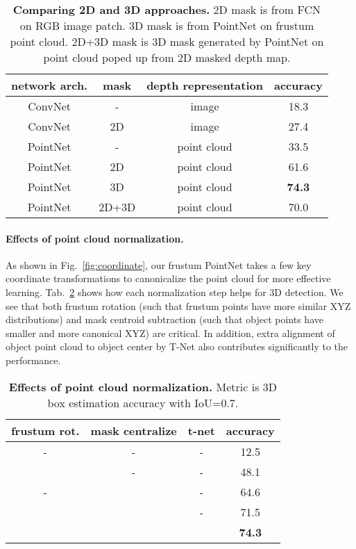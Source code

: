 \documentclass[10pt,twocolumn,letterpaper]{article}
\begin{document}
\begin{table}[t!]
\small
\centering
\begin{tabular}{c|c|c|c}
\hline
network arch. & mask & depth representation & accuracy \\ \hline
ConvNet        & -    & image & 18.3 \\
ConvNet        & 2D   & image & 27.4 \\ \hline
PointNet       & -    & point cloud & 33.5 \\
PointNet       & 2D   & point cloud & 61.6 \\
PointNet       & 3D   & point cloud & \textbf{74.3} \\
PointNet       & 2D+3D & point cloud & 70.0 \\ \hline
\end{tabular}
\caption{\textbf{Comparing 2D and 3D approaches.} 2D mask is from FCN on RGB image patch. 3D mask is from PointNet on frustum point cloud. 2D+3D mask is 3D mask generated by PointNet on point cloud poped up from 2D masked depth map.}
\label{tab:cnn_vs_pointnet}
\end{table}


\vspace{-0.06in}
\paragraph{Effects of point cloud normalization.} As shown in Fig.~\ref{fig:coordinate}, our frustum PointNet takes a few key coordinate transformations to canonicalize the point cloud for more effective learning. Tab.~\ref{tab:pc_normalization} shows how each normalization step helps for 3D detection. We see that both frustum rotation (such that frustum points have more similar XYZ distributions) and mask centroid subtraction (such that object points have smaller and more canonical XYZ) are critical. In addition, extra alignment of object point cloud to object center by T-Net also contributes significantly to the performance.



\begin{table}[t!]
\small
\centering
\begin{tabular}{c|c|c|c}
\hline
frustum rot. & mask centralize & t-net & accuracy \\ \hline
- & - & - & 12.5 \\
 & - & - & 48.1         \\
- &  & - & 64.6         \\
 &  & -& 71.5         \\
 &  &  & \textbf{74.3}         \\ \hline
\end{tabular}
\caption{\textbf{Effects of point cloud normalization.} Metric is 3D box estimation accuracy with IoU=0.7.}
\label{tab:pc_normalization}
\end{table}
\end{document}
